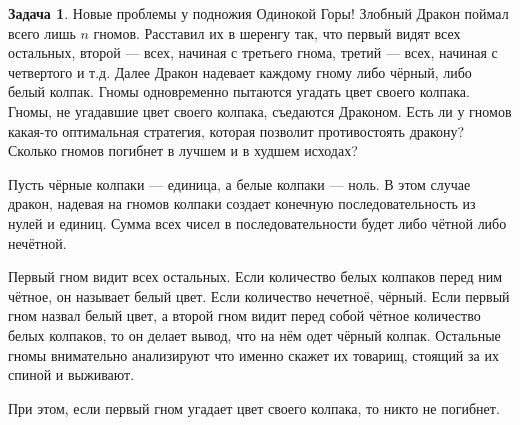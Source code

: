 \documentclass[pdftex, 12pt, a4paper]{article}
\theoremstyle{definition} %
\newtheorem{problem}{Задача}
\numberwithin{problem}{section}
\numberwithin{blits}{section}
\begin{document}
\begin{problem}Новые проблемы у подножия Одинокой Горы!
Злобный Дракон поймал всего лишь $n$ гномов. Расставил их в шеренгу так, что первый видят всех остальных, второй --- всех, начиная с третьего гнома, третий --- всех, начиная с четвертого и т.д. Далее Дракон надевает каждому гному либо чёрный, либо белый колпак. Гномы одновременно пытаются угадать цвет своего колпака. Гномы, не угадавшие цвет своего колпака, съедаются Драконом. Есть ли у гномов какая-то оптимальная стратегия, которая позволит противостоять дракону? Сколько гномов погибнет в лучшем и в худшем исходах?
\begin{sol}
Пусть чёрные колпаки --- единица, а белые колпаки --- ноль. В этом случае дракон, надевая на гномов колпаки создает конечную последовательность из нулей и единиц. Сумма всех чисел в последовательности будет либо чётной либо нечётной.

Первый гном видит всех остальных. Если количество белых колпаков перед ним чётное, он называет белый цвет. Если количество нечетноё, чёрный. Если первый гном назвал белый цвет, а второй гном видит перед собой чётное количество белых колпаков, то он делает вывод, что на нём одет чёрный колпак. Остальные гномы внимательно анализируют что именно скажет их товарищ, стоящий за их спиной и выживают.

При этом, если первый гном угадает цвет своего колпака, то никто не погибнет.
\end{sol}
\end{problem}







\printbibliography
\end{document}
